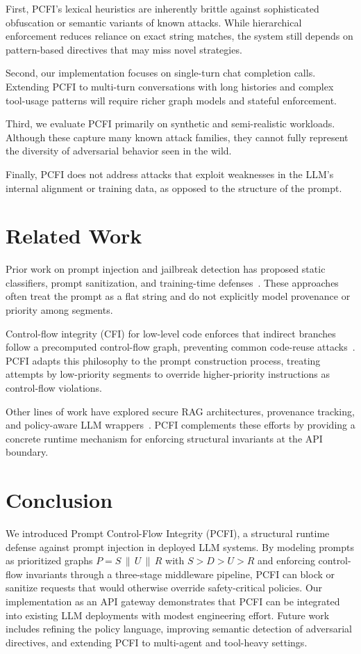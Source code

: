 \documentclass[conference]{IEEEtran}
\begin{document}
First, PCFI's lexical heuristics are inherently brittle against sophisticated obfuscation or semantic variants of known attacks. While hierarchical enforcement reduces reliance on exact string matches, the system still depends on pattern-based directives that may miss novel strategies.

Second, our implementation focuses on single-turn chat completion calls. Extending PCFI to multi-turn conversations with long histories and complex tool-usage patterns will require richer graph models and stateful enforcement.

Third, we evaluate PCFI primarily on synthetic and semi-realistic workloads. Although these capture many known attack families, they cannot fully represent the diversity of adversarial behavior seen in the wild.

Finally, PCFI does not address attacks that exploit weaknesses in the LLM's internal alignment or training data, as opposed to the structure of the prompt.

\section{Related Work}

Prior work on prompt injection and jailbreak detection has proposed static classifiers, prompt sanitization, and training-time defenses~\cite{sok_prompt_hacking,rag_n_roll}. These approaches often treat the prompt as a flat string and do not explicitly model provenance or priority among segments.

Control-flow integrity (CFI) for low-level code enforces that indirect branches follow a precomputed control-flow graph, preventing common code-reuse attacks~\cite{abadi_cfi}. PCFI adapts this philosophy to the prompt construction process, treating attempts by low-priority segments to override higher-priority instructions as control-flow violations.

Other lines of work have explored secure RAG architectures, provenance tracking, and policy-aware LLM wrappers~\cite{nemo_guardrails}. PCFI complements these efforts by providing a concrete runtime mechanism for enforcing structural invariants at the API boundary.

\section{Conclusion}

We introduced Prompt Control-Flow Integrity (PCFI), a structural runtime defense against prompt injection in deployed LLM systems. By modeling prompts as prioritized graphs $P = S \,\|\, U \,\|\, R$ with $S > D > U > R$ and enforcing control-flow invariants through a three-stage middleware pipeline, PCFI can block or sanitize requests that would otherwise override safety-critical policies. Our implementation as an API gateway demonstrates that PCFI can be integrated into existing LLM deployments with modest engineering effort. Future work includes refining the policy language, improving semantic detection of adversarial directives, and extending PCFI to multi-agent and tool-heavy settings.
\end{document}
